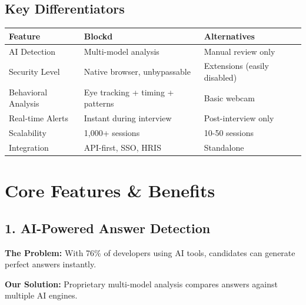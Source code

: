 \documentclass[11pt,letterpaper]{article}
\begin{document}
\subsection{Key Differentiators}

\begin{table}[H]
\centering
\small
\begin{tabularx}{\textwidth}{lXX}
\toprule
\textbf{Feature} & \textbf{Blockd} & \textbf{Alternatives} \\
\midrule
AI Detection & Multi-model analysis & Manual review only \\
Security Level & Native browser, unbypassable & Extensions (easily disabled) \\
Behavioral Analysis & Eye tracking + timing + patterns & Basic webcam \\
Real-time Alerts & Instant during interview & Post-interview only \\
Scalability & 1,000+ sessions & 10-50 sessions \\
Integration & API-first, SSO, HRIS & Standalone \\
\bottomrule
\end{tabularx}
\end{table}


\section{Core Features \& Benefits}

\subsection{1. AI-Powered Answer Detection}

\textbf{The Problem:} With 76\% of developers using AI tools\cite{stackoverflow2024}, candidates can generate perfect answers instantly.

\textbf{Our Solution:} Proprietary multi-model analysis compares answers against multiple AI engines.
\end{document}
